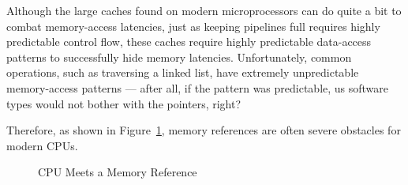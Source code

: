 Although the large caches found on modern microprocessors can do quite
a bit to combat memory-access latencies,
just as keeping pipelines full requires highly predictable control flow,
these caches require highly predictable data-access patterns to
successfully hide memory latencies.
Unfortunately, common operations, such as traversing a linked list,
have extremely unpredictable memory-access patterns --- after all,
if the pattern was predictable, us software types would not bother
with the pointers, right?

Therefore, as shown in
Figure~\ref{fig:cpu:CPU Meets a Memory Reference},
memory references are often severe obstacles for modern CPUs.

\begin{figure}[htb]
\begin{center}
\end{center}
\caption{CPU Meets a Memory Reference}
\label{fig:cpu:CPU Meets a Memory Reference}
\end{figure}


